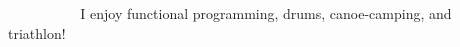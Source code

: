 
  \vspace{\acvSectionTopSkip}
\,\,\,\,\,\,\,\,\,\,\,\,\,\,\,\,\,\,\,\,\,\,\,\,\,\,\,\,\,
{\large I enjoy functional programming, drums, canoe-camping, and triathlon!}


